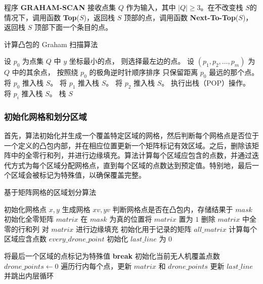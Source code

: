 \documentclass[bwprint]{gmcmthesis}
\numberwithin{figure}{section}
\begin{document}
程序 \textbf{GRAHAM-SCAN} 接收点集 \( Q \) 作为输入，其中 \( |Q| \geq 3 \)。在不改变栈 \( S \)的情况下，调用函数 \textbf{Top}(\( S \))，返回栈 \( S \) 顶部的点，调用函数 \textbf{Next-To-Top}(\( S \))，返回栈 \( S \) 顶部下面一个条目的点\cite{10.5555/1614191}。

\begin{algorithm}
	\caption{计算凸包的 Graham 扫描算法}
	\begin{algorithmic}[1] %
		\State 设 $p_0$ 为点集 $Q$ 中 $y$ 坐标最小的点，
		\State 则选择最左边的点。
		\EndIf
		\State 设 $(p_1, p_2, \dots, p_m)$ 为 $Q$ 中的其余点，
		\State 按照绕 $p_0$ 的极角逆时针顺序排序
		\State 只保留距离 $p_0$ 最远的那个点。
		\EndIf
		\State 将 $p_0$ 推入栈 $S$。
		\State 将 $p_1$ 推入栈 $S$。
		\State 将 $p_2$ 推入栈 $S$。
		\State 执行出栈（POP）操作。
		\EndWhile
		\State 将 $p_i$ 推入栈 $S$。
		\EndFor
		\State \Return 栈 $S$
	\end{algorithmic}
\end{algorithm}

\subsubsection{初始化网格和划分区域}
首先，算法初始化并生成一个覆盖特定区域的网格，然后判断每个网格点是否位于一个定义的凸包内部，并在相应位置更新一个矩阵标记有效区域。之后，删除该矩阵中的全零行和列，并进行边缘填充。算法计算每个区域应包含的点数，并通过迭代方式为每个区域分配网格点，直到每个区域的点数达到预定值。特别地，最后一个区域会被标记为特殊值，以确保覆盖完整。
\begin{algorithm}
	\caption{基于矩阵网格的区域划分算法}
	\begin{algorithmic}[1]
		\State 初始化网格点 $x, y$
		\State 生成网格 $xv, yv$
		\State 判断网格点是否在凸包内，存储结果于 $mask$
		\State 初始化全零矩阵 $matrix$
		\State 在 $mask$ 为真的位置将 $matrix$ 置为 $1$
		\State 删除 $matrix$ 中全零的行和列
		\State 对 $matrix$ 进行边缘填充
		\State 初始化用于记录的矩阵 $all\_matrix$
		\State 计算每个区域应含点数 $every\_drone\_point$
		\State 初始化 $last\_line$ 为 0
		
		\State 将最后一个区域的点标记为特殊值
		\State \textbf{break}
		\EndIf
		\State 初始化当前无人机覆盖点数 $drone\_points \gets 0$
		\State 遍历行内每个点，更新 $matrix$ 和 $drone\_points$
		\State 更新 $last\_line$ 并跳出内层循环
		\EndIf
		\EndFor
		\EndFor
	\end{algorithmic}
\end{algorithm}
\end{document}
